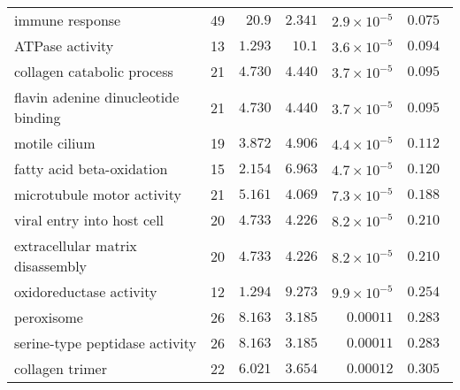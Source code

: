 \begin{longtable}{|l|r|r|r|r|r|}
                                   immune response &                      49 &                $  20.9$ &   $ 2.341$ &  $2.9\times 10^{-5}$ &                    $ 0.075~~$ \\
                                   ATPase activity &                      13 &                $ 1.293$ &   $  10.1$ &  $3.6\times 10^{-5}$ &                    $ 0.094~~$ \\
                        collagen catabolic process &                      21 &                $ 4.730$ &   $ 4.440$ &  $3.7\times 10^{-5}$ &                    $ 0.095~~$ \\
               flavin adenine dinucleotide binding &                      21 &                $ 4.730$ &   $ 4.440$ &  $3.7\times 10^{-5}$ &                    $ 0.095~~$ \\
                                     motile cilium &                      19 &                $ 3.872$ &   $ 4.906$ &  $4.4\times 10^{-5}$ &                    $ 0.112~~$ \\
                         fatty acid beta-oxidation &                      15 &                $ 2.154$ &   $ 6.963$ &  $4.7\times 10^{-5}$ &                    $ 0.120~~$ \\
                        microtubule motor activity &                      21 &                $ 5.161$ &   $ 4.069$ &  $7.3\times 10^{-5}$ &                    $ 0.188~~$ \\
                        viral entry into host cell &                      20 &                $ 4.733$ &   $ 4.226$ &  $8.2\times 10^{-5}$ &                    $ 0.210~~$ \\
                  extracellular matrix disassembly &                      20 &                $ 4.733$ &   $ 4.226$ &  $8.2\times 10^{-5}$ &                    $ 0.210~~$ \\
                           oxidoreductase activity &                      12 &                $ 1.294$ &   $ 9.273$ &  $9.9\times 10^{-5}$ &                    $ 0.254~~$ \\
                                        peroxisome &                      26 &                $ 8.163$ &   $ 3.185$ &            $0.00011$ &                    $ 0.283~~$ \\
                    serine-type peptidase activity &                      26 &                $ 8.163$ &   $ 3.185$ &            $0.00011$ &                    $ 0.283~~$ \\
                                   collagen trimer &                      22 &                $ 6.021$ &   $ 3.654$ &            $0.00012$ &                    $ 0.305~~$ \\

\end{longtable}
